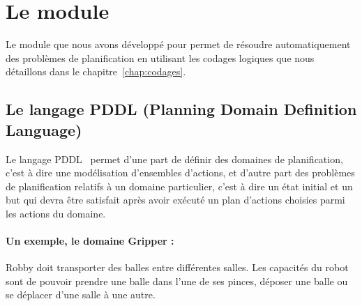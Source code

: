 \newpage
\section{Le module \touistplan}\label{chap:touist:touistplan}



Le module \touistplan que nous avons développé pour \touist permet de résoudre automatiquement des problèmes de planification en utilisant les codages logiques que nous détaillons dans le chapitre~\ref{chap:codages}.

\subsection{Le langage PDDL (Planning Domain Definition Language)}

Le langage PDDL~\cite{mcdermott98pddl} permet d'une part de définir des domaines de planification, c'est à dire une modélisation d'ensembles d'actions, et d'autre part des problèmes de planification relatifs à un domaine particulier, c'est à dire un état initial et un but qui devra être satisfait après avoir exécuté un plan d'actions choisies parmi les actions du domaine.

\paragraph*{Un exemple, le domaine Gripper :} Robby doit transporter des balles entre différentes salles. Les capacités du robot sont de pouvoir prendre une balle dans l'une de ses pinces, déposer une balle ou se déplacer d'une salle à une autre.%

